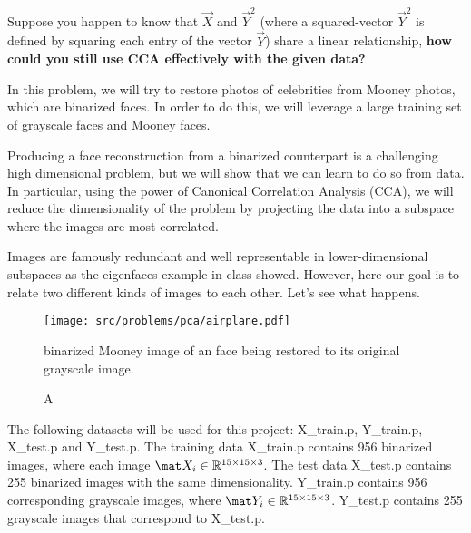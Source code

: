 \documentclass[preview]{standalone}
\begin{document}
\begin{Parts}



\Part Suppose you happen to know that $\vec X$ and $\vec Y^2$ (where a squared-vector $\vec Y^2$ is defined by
squaring each entry of the vector $\vec Y$) share a linear relationship, {\bf how could you still use CCA
effectively with the given data?}




\end{Parts}

In this problem, we will try to restore photos of celebrities from Mooney photos, which are binarized faces. In order to do this, we will leverage a large training set of grayscale faces and Mooney faces. 

Producing a face reconstruction from a binarized counterpart is a
challenging high dimensional problem, but we will show that we can
learn to do so from data. In particular, using the power of Canonical
Correlation Analysis (CCA), we will reduce the dimensionality of the
problem by projecting the data into a subspace where the images are
most correlated. 

Images are famously redundant and well representable in lower-dimensional
subspaces as the eigenfaces example in class showed. However, here our
goal is to relate two different kinds of images to each other. Let's
see what happens.

\begin{figure}[h!]
    \begin{center}
    \texttt{[image: src/problems/pca/airplane.pdf]}
    {\caption A binarized Mooney image of an face being restored to its original grayscale image.  } \label{fig:robot}
    \end{center}
\end{figure}


The following datasets will be used for this project: X\_train.p,
Y\_train.p, X\_test.p and Y\_test.p. The training data X\_train.p
contains 956 binarized images, where each image $\mat X_i \in \mathbb{R}^{15 \times 15
  \times 3}$. The test data X\_test.p contains 255 binarized images
with the same dimensionality. Y\_train.p contains 956 corresponding
grayscale images, where $\mat Y_i \in  \mathbb{R}^{ 15 \times 15 \times 3
}$. Y\_test.p contains 255 grayscale images that correspond to
X\_test.p. 
\end{document}
